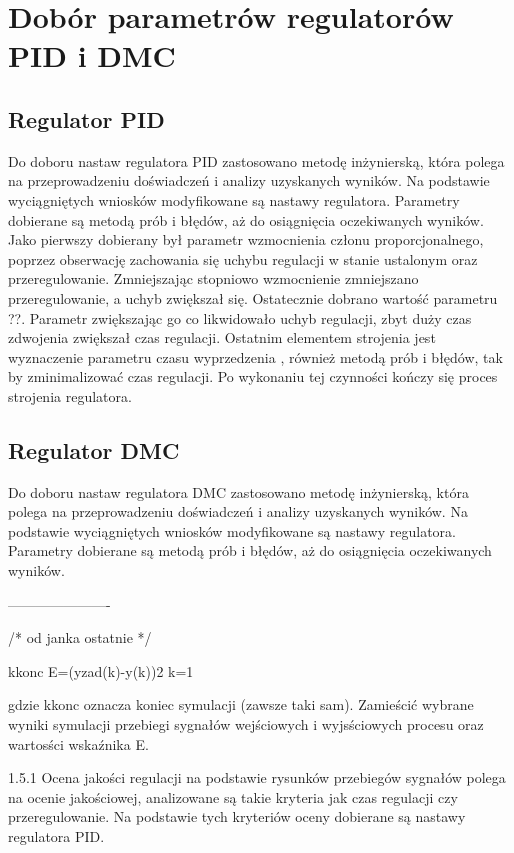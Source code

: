 \section{Dobór parametrów regulatorów PID i DMC}
\subsection{Regulator PID}

Do doboru nastaw regulatora PID zastosowano metodę inżynierską, 
która polega na przeprowadzeniu doświadczeń i analizy uzyskanych wyników. 
Na podstawie wyciągniętych wniosków modyfikowane są nastawy regulatora. 
Parametry  dobierane są metodą prób i błędów, aż do osiągnięcia oczekiwanych wyników. 
Jako pierwszy dobierany był parametr wzmocnienia członu proporcjonalnego, 
poprzez obserwację zachowania się uchybu regulacji w stanie ustalonym oraz przeregulowanie. 
Zmniejszając stopniowo wzmocnienie zmniejszano przeregulowanie, a uchyb zwiększał się. 
Ostatecznie dobrano wartość parametru ??. 
Parametr  zwiększając go co likwidowało uchyb regulacji,  
zbyt duży czas zdwojenia zwiększał czas regulacji. 
Ostatnim elementem strojenia jest wyznaczenie parametru czasu wyprzedzenia , 
również metodą prób i błędów, tak by zminimalizować czas regulacji. 
Po wykonaniu tej czynności kończy się proces strojenia regulatora.

\subsection{Regulator DMC}

Do doboru nastaw regulatora DMC zastosowano metodę inżynierską, 
która polega na przeprowadzeniu doświadczeń i analizy uzyskanych wyników. 
Na podstawie wyciągniętych wniosków modyfikowane są nastawy regulatora. 
Parametry  dobierane są metodą prób i błędów, aż do osiągnięcia oczekiwanych wyników.

----------------------

/* od janka ostatnie */


kkonc
E=(yzad(k)-y(k))2
k=1


gdzie kkonc oznacza koniec symulacji (zawsze taki sam). 
Zamieścić wybrane wyniki symulacji 
przebiegi sygnałów wejściowych i 
wyjsściowych procesu oraz wartosści wskaźnika E. 

1.5.1 
Ocena jakości regulacji na podstawie rysunków przebiegów sygnałów polega na ocenie jakościowej, analizowane są takie kryteria jak czas regulacji czy przeregulowanie. Na podstawie tych kryteriów oceny dobierane są nastawy regulatora PID.

